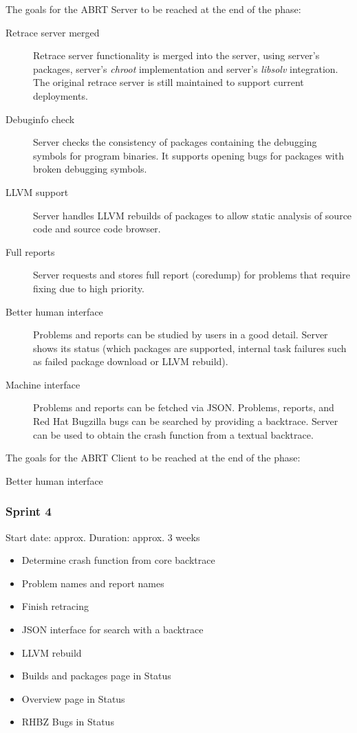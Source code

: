 \documentclass{article}
\begin{document}
The goals for the ABRT Server to be reached at the end of the
phase:
\begin{description}
\item[Retrace server merged] Retrace server functionality is merged
  into the server, using server's packages, server's \textit{chroot}
  implementation and server's \textit{libsolv} integration.  The
  original retrace server is still maintained to support current
  deployments.
\item[Debuginfo check] Server checks the consistency of packages
  containing the debugging symbols for program binaries.  It supports
  opening bugs for packages with broken debugging symbols.
\item[LLVM support] Server handles LLVM rebuilds of packages to allow
  static analysis of source code and source code browser.
\item[Full reports] Server requests and stores full report (coredump)
  for problems that require fixing due to high priority.
\item[Better human interface] Problems and reports can be studied by
  users in a good detail.  Server shows its status (which packages are
  supported, internal task failures such as failed package download or
  LLVM rebuild).
\item[Machine interface] Problems and reports can be fetched via
  JSON. Problems, reports, and Red Hat Bugzilla bugs can be searched
  by providing a backtrace.  Server can be used to obtain the crash
  function from a textual backtrace.
\end{description}

The goals for the ABRT Client to be reached at the end of the phase:
\begin{description}
\item[Better human interface]
\end{description}

\cleardoublepage
\subsubsection{Sprint 4}
Start date: approx.
Duration: approx. 3 weeks

\begin{itemize}
\item Determine crash function from core backtrace
\item Problem names and report names
\item Finish retracing
\item JSON interface for search with a backtrace
\item LLVM rebuild
\item Builds and packages page in Status
\item Overview page in Status
\item RHBZ Bugs in Status
\end{itemize}
\end{document}
